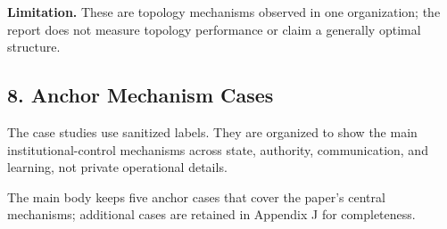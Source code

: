 \documentclass[
]{article}
\begin{document}
\textbf{Limitation.} These are topology mechanisms observed in one organization; the report does not measure topology performance or claim a generally optimal structure.

\subsection{8. Anchor Mechanism Cases}\label{anchor-mechanism-cases}

The case studies use sanitized labels. They are organized to show the main institutional-control mechanisms across state, authority, communication, and learning, not private operational details.

The main body keeps five anchor cases that cover the paper's central mechanisms; additional cases are retained in Appendix J for completeness.
\end{document}
